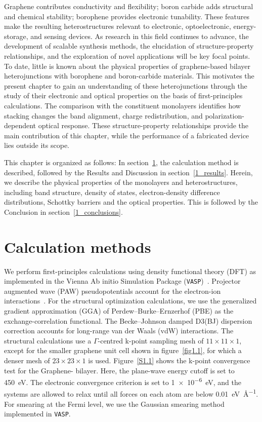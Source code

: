 Graphene contributes conductivity and flexibility; boron carbide adds structural and chemical stability; borophene provides electronic tunability.
These features make the resulting heterostructures relevant to electronic, optoelectronic, energy-storage, and sensing devices.
As research in this field continues to advance,
the development of scalable synthesis methods, the elucidation of structure-property relationships,
and the exploration of novel applications will be key focal points.
To date, little is known about the physical properties of graphene-based bilayer heterojunctions with borophene and boron-carbide materials.
This motivates the present chapter to gain an understanding of these heterojunctions
through the study of their electronic and optical properties on the basis of first-principles calculations.
The comparison with the constituent monolayers identifies how stacking changes the band alignment, charge redistribution, and polarization-dependent optical response.
These structure-property relationships provide the main contribution of this chapter,
while the performance of a fabricated device lies outside its scope.

This chapter is organized as follows:
In section~\ref{1_calculation_methods}, the calculation method is described,
followed by the Results and Discussion in section~\ref{1_results}.
Herein, we describe the physical properties of the monolayers and heterostructures, including band structure, density of states, electron-density difference distributions,
Schottky barriers and the optical properties.
This is followed by the Conclusion in section~\ref{1_conclusions}.

\section{Calculation methods}
\label{1_calculation_methods}

We perform first-principles calculations using density functional theory (DFT) as implemented in the Vienna Ab initio Simulation Package (\texttt{VASP})~\cite{kresse1993ab, kresse1996efficiency, kresse1996efficient}.
Projector augmented wave (PAW) pseudopotentials account for the electron-ion interactions~\cite{kresse1999ultrasoft}.
For the structural optimization calculations, we use the generalized gradient approximation (GGA) of Perdew--Burke--Ernzerhof (PBE) as the exchange-correlation functional.
The Becke--Johnson damped D3(BJ) dispersion correction accounts for long-range van der Waals (vdW) interactions.
The structural calculations use a $\Gamma$-centred k-point sampling mesh of $11 \times 11 \times 1$, except for the smaller graphene unit cell shown in figure~\ref{fig1.1}, for which a denser mesh of $23 \times 23 \times 1$ is used.
Figure~\ref{S1.1} shows the k-point convergence test for the Graphene- bilayer.
Here, the plane-wave energy cutoff is set to \qty{450}{\electronvolt}.
The electronic convergence criterion is set to \qty{1e-6}{\electronvolt}, and the systems are allowed to relax until all forces on each atom are below \qty{0.01}{\electronvolt\per\angstrom}.
For smearing at the Fermi level,
we use the Gaussian smearing method implemented in \texttt{VASP}.


